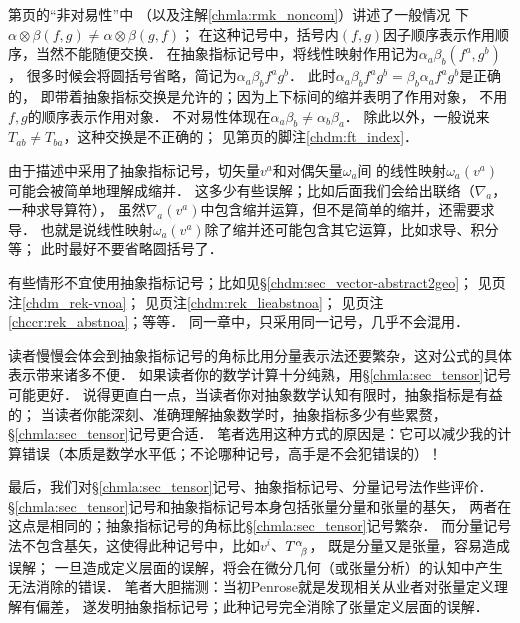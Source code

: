  第\pageref{chmla:sec_noncom}页的“非对易性”中
（以及注解\ref{chmla:rmk_noncom}）讲述了一般情况
下$\alpha \otimes \beta(f,g) \neq \alpha \otimes \beta(g,f)$；
在这种记号中，括号内$(f,g)$因子顺序表示作用顺序，当然不能随便交换．
在抽象指标记号中，将线性映射作用记为$\alpha _a \beta _b (f^a, g^b)$，
很多时候会将圆括号省略，简记为$\alpha _a \beta _b f^a g^b$．
此时$\alpha _a \beta _b f^a g^b=\beta_b \alpha_a f^a g^b$是正确的，
即带着抽象指标交换是允许的；因为上下标间的缩并表明了作用对象，
不用$f,g$的顺序表示作用对象．
不对易性体现在$\alpha _a \beta _b \neq \alpha_b \beta_a$．
除此以外，一般说来$T_{ab}\neq T_{ba}$，这种交换是不正确的；
见第\pageref{chdm:ft_index}页的脚注\ref{chdm:ft_index}．

 由于描述中采用了抽象指标记号，切矢量$v^a$和对偶矢量$\omega_a$间
的线性映射$\omega_a(v^a)$可能会被简单地理解成缩并．
这多少有些误解；比如后面我们会给出联络（$\nabla_a$，一种求导算符），
虽然$\nabla_a (v^a)$中包含缩并运算，但不是简单的缩并，还需要求导．
也就是说线性映射$\omega_a(v^a)$除了缩并还可能包含其它运算，比如求导、积分等；
此时最好不要省略圆括号了．


  有些情形不宜使用抽象指标记号；比如见\S \ref{chdm:sec_vector-abstract2geo}；
见\pageref{chdm_rek-vnoa}页注\ref{chdm_rek-vnoa}；
见\pageref{chdm:rek_lieabstnoa}页注\ref{chdm:rek_lieabstnoa}；
见\pageref{chccr:rek_abstnoa}页注\ref{chccr:rek_abstnoa}；等等．
同一章中，只采用同一记号，几乎不会混用．




读者慢慢会体会到抽象指标记号的角标比用分量表示法还要繁杂，这对公式的具体表示带来诸多不便．
如果读者你的数学计算十分纯熟，用\S\ref{chmla:sec_tensor}记号可能更好．
说得更直白一点，当读者你对抽象数学认知有限时，抽象指标是有益的；
当读者你能深刻、准确理解抽象数学时，抽象指标多少有些累赘，\S\ref{chmla:sec_tensor}记号更合适．
笔者选用这种方式的原因是：它可以减少我的计算错误（本质是数学水平低；不论哪种记号，高手是不会犯错误的）！



最后，我们对\S\ref{chmla:sec_tensor}记号、抽象指标记号、分量记号法作些评价．
\S\ref{chmla:sec_tensor}记号和抽象指标记号本身包括张量分量和张量的基矢，
两者在这点是相同的；抽象指标记号的角标比\S\ref{chmla:sec_tensor}记号繁杂．
而分量记号法不包含基矢，这使得此种记号中，比如$v^i$、$T^\alpha_{\hphantom{\alpha}\beta}$，
既是分量又是张量，容易造成误解；
一旦造成定义层面的误解，将会在微分几何（或张量分析）的认知中产生无法消除的错误．
笔者大胆揣测：当初Penrose就是发现相关从业者对张量定义理解有偏差，
遂发明抽象指标记号；此种记号完全消除了张量定义层面的误解．



